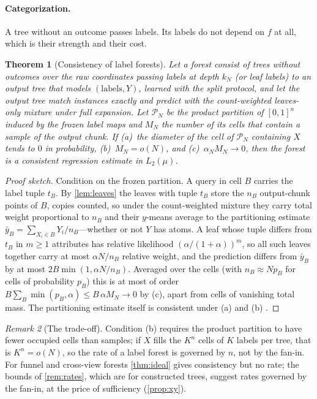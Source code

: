 \documentclass[11pt]{article}
\newtheorem{theorem}{Theorem}
\theoremstyle{definition}
\theoremstyle{remark}
\newtheorem{remark}[theorem]{Remark}
\begin{document}
\paragraph{Categorization.}
A tree without an outcome passes labels.  Its labels do not depend on $f$ at all, which
is their strength and their cost.

\begin{theorem}[Consistency of label forests]\label{thm:labelcons}
Let a forest consist of trees without outcomes over the raw coordinates passing labels
at depth $k_N$ (or leaf labels) to an output tree that models $(\text{labels},Y)$, learned
with the split protocol, and let the output tree match instances exactly and predict with
the count-weighted leaves-only mixture under full expansion.  Let $\mathcal P_N$ be the
product partition of $[0,1]^n$ induced by the frozen label maps and $M_N$ the number of
its cells that contain a sample of the output chunk.  If (a)~the diameter of the cell of
$\mathcal P_N$ containing $X$ tends to $0$ in probability, (b)~$M_N=o(N)$, and
(c)~$\alpha_NM_N\to0$, then the forest is a consistent regression estimate in $L_2(\mu)$.
\end{theorem}
\begin{proof}[Proof sketch]
Condition on the frozen partition.  A query in cell $B$ carries the label tuple $t_B$.  By
\cref{lem:leaves} the leaves with tuple $t_B$ store the $n_B$ output-chunk points of $B$,
copies counted, so under the count-weighted mixture they carry total weight proportional
to $n_B$ and their $y$-means average to the partitioning estimate
$\bar y_B=\sum_{X_i\in B}Y_i/n_B$---whether or not $Y$ has atoms.  A leaf whose tuple
differs from $t_B$ in $m\ge1$ attributes has relative likelihood $(\alpha/(1+\alpha))^m$, so
all such leaves together carry at most $\alpha N/n_B$ relative weight, and the prediction
differs from $\bar y_B$ by at most $2B\min(1,\alpha N/n_B)$.  Averaged over the cells
(with $n_B\approx Np_B$ for cells of probability $p_B$) this is at most of order
$B\sum_B\min(p_B,\alpha)\le B\,\alpha M_N\to0$ by (c), apart from cells of vanishing total
mass.  The partitioning estimate itself is consistent under (a) and (b)
\citep[Thm.~4.2]{gyorfi2002}.
\end{proof}

\begin{remark}[The trade-off]\label{rem:tradeoff}
Condition (b) requires the product partition to have fewer occupied cells than samples;
if $X$ fills the $K^n$ cells of $K$ labels per tree, that is $K^n=o(N)$, so the rate of a
label forest is governed by $n$, not by the fan-in.  For funnel and cross-view forests
\cref{thm:ideal} gives consistency but no rate; the bounds of \cref{rem:rates}, which are
for constructed trees, suggest rates governed by the fan-in, at the price of sufficiency
(\cref{prop:xy}).
\end{remark}
\end{document}
